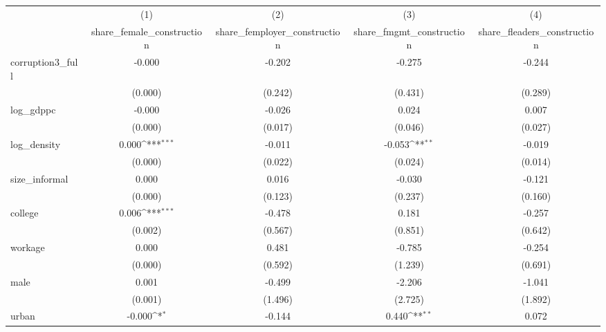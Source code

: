 {
\def\sym#1{\ifmmode^{#1}\else\(^{#1}\)\fi}
\begin{tabular}{l*{4}{c}}
\hline\hline
            &\multicolumn{1}{c}{(1)}&\multicolumn{1}{c}{(2)}&\multicolumn{1}{c}{(3)}&\multicolumn{1}{c}{(4)}\\
            &\multicolumn{1}{c}{share\_female\_construction}&\multicolumn{1}{c}{share\_femployer\_construction}&\multicolumn{1}{c}{share\_fmgmt\_construction}&\multicolumn{1}{c}{share\_fleaders\_construction}\\
\hline
corruption3\_full&      -0.000         &      -0.202         &      -0.275         &      -0.244         \\
            &     (0.000)         &     (0.242)         &     (0.431)         &     (0.289)         \\
[1em]
log\_gdppc   &      -0.000         &      -0.026         &       0.024         &       0.007         \\
            &     (0.000)         &     (0.017)         &     (0.046)         &     (0.027)         \\
[1em]
log\_density &       0.000\sym{***}&      -0.011         &      -0.053\sym{**} &      -0.019         \\
            &     (0.000)         &     (0.022)         &     (0.024)         &     (0.014)         \\
[1em]
size\_informal&       0.000         &       0.016         &      -0.030         &      -0.121         \\
            &     (0.000)         &     (0.123)         &     (0.237)         &     (0.160)         \\
[1em]
college     &       0.006\sym{***}&      -0.478         &       0.181         &      -0.257         \\
            &     (0.002)         &     (0.567)         &     (0.851)         &     (0.642)         \\
[1em]
workage     &       0.000         &       0.481         &      -0.785         &      -0.254         \\
            &     (0.000)         &     (0.592)         &     (1.239)         &     (0.691)         \\
[1em]
male        &       0.001         &      -0.499         &      -2.206         &      -1.041         \\
            &     (0.001)         &     (1.496)         &     (2.725)         &     (1.892)         \\
[1em]
urban       &      -0.000\sym{*}  &      -0.144         &       0.440\sym{**} &       0.072         \\

\end{tabular}}
